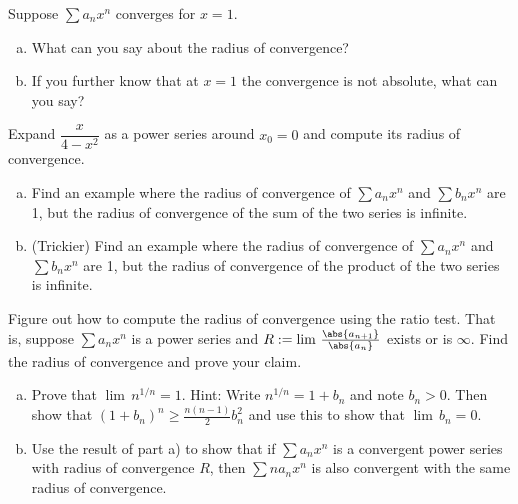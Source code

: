 \documentclass[12pt]{book}
\begin{document}
\begin{exercise}
Suppose $\sum a_n x^n$ converges for $x=1$.
\begin{enumerate}[a)]\item What can you say about the radius of convergence?
\item If you further know that at $x=1$ the convergence is not absolute, what can you say?
\end{enumerate}
\end{exercise}

\begin{exercise}
Expand
$\dfrac{x}{4-x^2}$ as a power series around $x_0 = 0$ and compute its radius
of convergence.
\end{exercise}

\begin{exercise}
\begin{enumerate}[a)]
 \item Find an example where the radius of convergence of $\sum a_n x^n$ and
$\sum b_n x^n$ are 1, but the radius of convergence of
the sum of the two series is infinite.
 \item (Trickier)
Find an example where the radius of convergence of $\sum a_n x^n$ and
$\sum b_n x^n$ are 1, but the radius of convergence of
the product of the two series is infinite.
\end{enumerate}
\end{exercise}

\begin{exercise}
Figure out how to compute the radius of convergence using the ratio test.
That is, suppose $\sum a_n x^n$ is a power series and
$R := \lim \, \frac{\abs{a_{n+1}}}{\abs{a_n}}$ exists or is $\infty$.
Find the radius of convergence and prove your claim.
\end{exercise}

\begin{exercise}
\begin{enumerate}[a)]
 \item Prove that $\lim \, n^{1/n} = 1$.
Hint:  Write $n^{1/n} = 1+b_n$ and
note $b_n > 0$.
Then show that ${(1+b_n)}^n \geq 
\frac{n(n-1)}{2}b_n^2$ and use this to show that $\lim \, b_n = 0$.
  \item Use
the result of part a) to show that if $\sum a_n x^n$ is a convergent power series with
radius of convergence $R$, then $\sum n a_n x^n$ is also convergent with the
same radius of convergence.
\end{enumerate}
\end{exercise}
\end{document}
